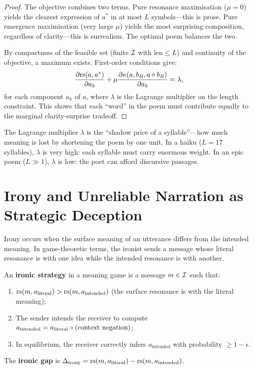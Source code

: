 \begin{proof}
The objective combines two terms.  Pure resonance maximisation
($\mu = 0$) yields the clearest expression of $a^*$ in at most
$L$ symbols---this is prose.  Pure emergence maximisation
(very large $\mu$) yields the most surprising composition,
regardless of clarity---this is surrealism.  The optimal poem
balances the two.

By compactness of the feasible set (finite $\mathcal{I}$ with
$\mathrm{len} \le L$) and continuity of the objective, a
maximum exists.  First-order conditions give:
\[
  \frac{\partial \mathrm{rs}(a, a^*)}{\partial a_k}
  + \mu \frac{\partial \kappa(a, b_R, a \circ b_R)}{\partial a_k}
  = \lambda,
\]
for each component $a_k$ of $a$, where $\lambda$ is the Lagrange
multiplier on the length constraint.  This shows that each
``word'' in the poem must contribute equally to the marginal
clarity-surprise tradeoff.
\end{proof}

\begin{remark}
The Lagrange multiplier $\lambda$ is the ``shadow price of a
syllable''---how much meaning is lost by shortening the poem
by one unit.  In a haiku ($L = 17$ syllables), $\lambda$ is
very high: each syllable must carry enormous weight.  In an
epic poem ($L \gg 1$), $\lambda$ is low: the poet can afford
discursive passages.
\end{remark}

\section{Irony and Unreliable Narration as Strategic Deception}
\label{sec:irony}

Irony occurs when the surface meaning of an utterance differs
from the intended meaning.  In game-theoretic terms, the ironist
sends a message whose literal resonance is with one idea while
the intended resonance is with another.

\begin{definition}
\label{def:irony}
An \textbf{ironic strategy} in a meaning game is a message
$m \in \mathcal{I}$ such that:
\begin{enumerate}[label=(\roman*)]
  \item $\mathrm{rs}(m, a_{\mathrm{literal}}) > \mathrm{rs}(m, a_{\mathrm{intended}})$
    (the surface resonance is with the literal meaning);
  \item The sender intends the receiver to compute
    $a_{\mathrm{intended}} = a_{\mathrm{literal}} \circ
    (\text{context negation})$;
  \item In equilibrium, the receiver correctly infers
    $a_{\mathrm{intended}}$ with probability $\ge 1 - \epsilon$.
\end{enumerate}
The \textbf{ironic gap} is $\Delta_{\mathrm{irony}} =
\mathrm{rs}(m, a_{\mathrm{literal}}) - \mathrm{rs}(m, a_{\mathrm{intended}})$.
\end{definition}

